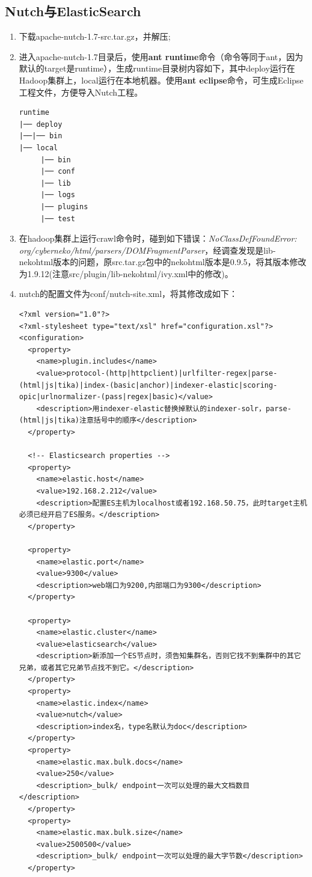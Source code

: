\subsection{Nutch与ElasticSearch}
\begin{enumerate}[(1)]
\item 下载apache-nutch-1.7-src.tar.gz，并解压;
\item 进入apache-nutch-1.7目录后，使用\textbf{ant runtime}命令（命令等同于ant，因为默认的target是runtime），生成runtime目录树内容如下，其中deploy运行在Hadoop集群上，local运行在本地机器。使用\textbf{ant eclipse}命令，可生成Eclipse工程文件，方便导入Nutch工程。
\begin{verbatim}
runtime
|── deploy
|──|── bin
|── local
     |── bin
     |── conf
     |── lib
     |── logs
     |── plugins
     |── test
\end{verbatim}
\item 在hadoop集群上运行crawl命令时，碰到如下错误：\textsl{NoClassDefFoundError: org/cyberneko/html/parsers/DOMFragmentParser}，经调查发现是lib-nekohtml版本的问题，原src.tar.gz包中的nekohtml版本是0.9.5，将其版本修改为1.9.12(注意src/plugin/lib-nekohtml/ivy.xml中的修改)。
\item nutch的配置文件为conf/nutch-site.xml，将其修改成如下：
\begin{verbatim}
<?xml version="1.0"?>
<?xml-stylesheet type="text/xsl" href="configuration.xsl"?>
<configuration>
  <property>
    <name>plugin.includes</name>
    <value>protocol-(http|httpclient)|urlfilter-regex|parse-(html|js|tika)|index-(basic|anchor)|indexer-elastic|scoring-opic|urlnormalizer-(pass|regex|basic)</value>
    <description>用indexer-elastic替换掉默认的indexer-solr，parse-(html|js|tika)注意括号中的顺序</description>
  </property>

  <!-- Elasticsearch properties -->
  <property>
    <name>elastic.host</name>
    <value>192.168.2.212</value>
    <description>配置ES主机为localhost或者192.168.50.75，此时target主机必须已经开启了ES服务。</description>
  </property>
  
  <property>
    <name>elastic.port</name>
    <value>9300</value>
    <description>web端口为9200,内部端口为9300</description>
  </property>
  
  <property>
    <name>elastic.cluster</name>
    <value>elasticsearch</value>
    <description>新添加一个ES节点时，须告知集群名，否则它找不到集群中的其它兄弟，或者其它兄弟节点找不到它。</description>
  </property>
  <property>
    <name>elastic.index</name>
    <value>nutch</value>
    <description>index名，type名默认为doc</description>
  </property>
  <property>
    <name>elastic.max.bulk.docs</name>
    <value>250</value>
    <description>_bulk/ endpoint一次可以处理的最大文档数目</description>
  </property>
  <property>
    <name>elastic.max.bulk.size</name>
    <value>2500500</value>
    <description>_bulk/ endpoint一次可以处理的最大字节数</description>
  </property>


\end{verbatim}
\end{enumerate}
